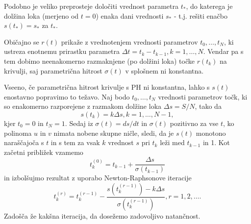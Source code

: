 \documentclass[a4paper]{IEEEtran}
\begin{document}
	Podobno je veliko preprosteje določiti vrednost parametra $t_*$, do katerega je dolžina loka (merjeno od $t = 0$) enaka dani vrednosti $s_*$ - t.j. rešiti enačbo $s (t_*) = s_*$ za $t_*$.
	
	Običajno se $r (t)$ prikaže z vrednotenjem vrednosti parametrov $t_0,\ldots , t_N$, ki ustreza enotnemu prirastku parametra $\Delta t = t_k- t_{k- 1}, k = 1,\ldots , N$. Vendar pa s tem dobimo neenakomerno razmaknjene (po dolžini loka) točke $r (t_k)$ na krivulji, saj parametrična hitrost $\sigma (t)$ v splošnem ni konstantna.
	
	Vseeno, če parametrična hitrost krivulje s PH ni konstantna, lahko s $s (t)$ enostavno popravimo to težavo. Naj bodo $t_0,\ldots, t_N$ vrednosti parametrov točk, ki so enakomerno razporejene z razmakom dolžine loka $\Delta s = S / N$, tako da
	$$s (t_k) = k\Delta s, k = 1,\ldots , N - 1,$$
	kjer $t_0 = 0$ in $t_N = 1$. Sedaj iz $\sigma (t) = ds / dt$ in $\sigma (t)$ pozitivno za vse $t$, ko polinoma $u$ in $v$ nimata nobene skupne ničle, sledi, da je $s (t)$ monotono naraščajoča s $t$ in s tem za vsak $k$ vrednost $s$ pri $t_k$ leži med $t_{k - 1}$ in 1. Kot začetni približek vzamemo
	$$t^{(0)}_k = t_{k-1}+\frac{\Delta s}{\sigma(t_{k-1})}$$
	in izbolšujmo rezultat z uporabo Newton-Raphsonove iteracije
	$$t^{(r)}_k = t^{(r-1)}_k-\frac{s(t^{(r-1)}_k)-k\Delta s}{\sigma(t^{(r-1)}_k)}, r = 1, 2,\ldots.$$
	Zadošča že kakšna iteracija, da dosežemo zadovoljivo natančnost.
	
\end{document}
